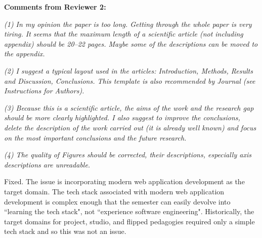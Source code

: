 \documentclass[12pt]{letter}
\begin{document}
\begin{letter}{}

{\bf Comments from Reviewer 2:}

{\em (1) In my opinion the paper is too long. Getting through the whole paper is very tiring. It seems that the maximum length of a scientific article (not including appendix) should be 20–22 pages. Maybe some of the descriptions can be moved to the appendix.}

{\em (2) I suggest a typical layout used in the articles: Introduction, Methods, Results and Discussion, Conclusions. This template is also recommended by Journal (see Instructions for Authors).}

{\em (3) Because this is a scientific article, the aims of the work and the research gap should be more clearly highlighted. I also suggest to improve the conclusions, delete the description of the work carried out (it is already well known) and focus on the most important conclusions and the future research. }

{\em (4) The quality of Figures should be corrected, their descriptions, especially axis descriptions are unreadable.}


Fixed.  The issue is incorporating modern web application development as the target domain.  The tech stack associated with modern web application development is complex enough that the semester can easily devolve into ``learning the tech stack", not ``experience software engineering".  Historically, the target domains for project, studio, and flipped pedagogies required only a simple tech stack and so this was not an issue.


\end{letter}
\end{document}

